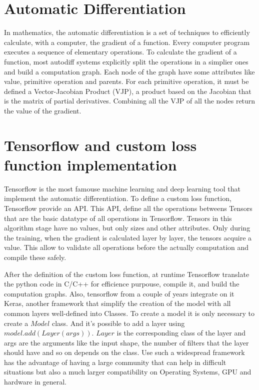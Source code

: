 \documentclass[12pt]{report}
\begin{document}
\section{Automatic Differentiation}
In mathematics, the automatic differentiation is a set of techniques to efficiently calculate, with a computer, the gradient of a function.
Every computer program executes a sequence of elementary operations. To calculate the gradient of a function,
most autodiff systems explicitly split the operations in a simplier ones and build a computation graph.
Each node of the graph have some attributes like value, primitive operation and parents.
For each primitive operation, it must be defined a Vector-Jacobian Product (VJP), a product based on the Jacobian
that is the matrix of partial derivatives. Combining all the VJP of all the nodes return the value of the gradient.

\section{Tensorflow and custom loss function implementation}
Tensorflow is the most famouse machine learning and deep learning tool that implement the automatic differentiation.
To define a custom loss function, Tensorflow provide an API. This API, define all the operations betweens Tensors that are the basic datatype of all operations in Tensorflow.
Tensors in this algorithm stage have no values, but only sizes and other attributes.
Only during the training, when the gradient is calculated layer by layer, the tensors acquire a value.
This allow to validate all operations before the actually computation and compile these safely.

After the definition of the custom loss function, at runtime Tensorflow translate the python code in C/C++ for efficience purpouse, compile it, and build the computation graphs.
Also, tensorflow from a couple of years integrate on it Keras, another framework that simplify the creation of the model with 
all common layers well-defined into Classes.
To create a model it is only necessary to create a $Model$ class.
And it's possible to add a layer using $model.add(Layer(args))$.
$Layer$ is the corresponding class of the layer and args are the arguments like the input shape, the number of filters that the layer should have and so on depends on the class. 
Use such a widespread framework has the advantage of having a large community that can help in difficult situations but 
also a much larger compatibility on Operating Systems, GPU and hardware in general.
\end{document}
